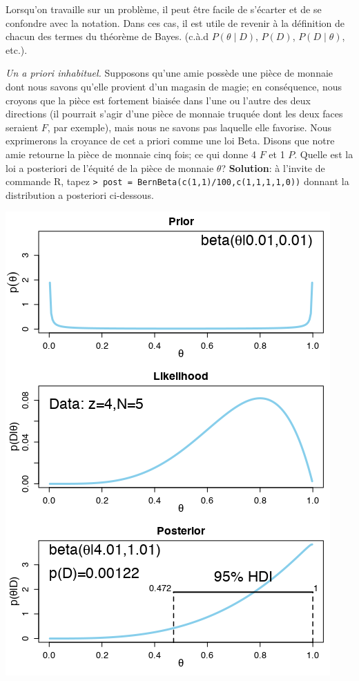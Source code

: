 \noindent Lorsqu'on travaille sur un problème, il peut être facile de s'écarter et de se confondre avec la notation. Dans ces cas, il est utile de revenir à la définition de chacun des termes du théorème de Bayes. (c.à.d \@ $P(\theta\mid D)$, $P(D)$, $P(D\mid \theta)$, etc.).
\begin{Exemple} \textit{Un a priori inhabituel.} \label{Ex:unusualprior}
Supposons qu'une amie possède une pièce de monnaie dont nous savons qu'elle provient d'un magasin de magie; en conséquence, nous croyons que la pièce est fortement biaisée dans l'une ou l'autre des deux directions (il pourrait s'agir d'une pièce de monnaie truquée dont les deux faces seraient $F$, par exemple), mais nous ne savons pas laquelle elle favorise.  Nous exprimerons la croyance de cet a priori comme une loi Beta. Disons que notre amie retourne la pièce de monnaie cinq fois; ce qui donne 4 $F$ et 1 $P$. Quelle est la loi a posteriori de l'équité de la pièce de monnaie $\theta$? \newl 
\textbf{Solution}: à l'invite de commande R, tapez \newl \small \texttt{> post = BernBeta(c(1,1)/100,c(1,1,1,1,0))}\normalsize\newl 
donnant la distribution a posteriori ci-dessous.  
\begin{center}
\includegraphics[width=\linewidth]{Images/example52.png}

\end{center}
\end{Exemple}
